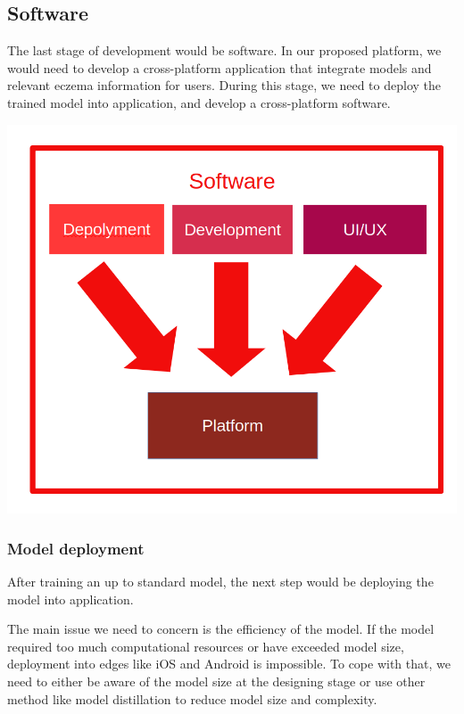     \subsection{Software}
        The last stage of development would be software. In our proposed platform, we would need to develop a cross-platform application that integrate models and relevant eczema information for users. During this stage, we need to deploy the trained model into application, and develop a cross-platform software.

                
        \begin{Figure}
            \centering
            \includegraphics[width=\linewidth]{Image/SoftwareWorkflow.png}
        \end{Figure}

        \subsubsection{Model deployment}
            After training an up to standard model, the next step would be deploying the model into application.

            The main issue we need to concern is the efficiency of the model. If the model required too much computational resources or have exceeded model size, deployment into edges like iOS and Android is impossible. To cope with that, we need to either be aware of the model size at the designing stage or use other method like model distillation to reduce model size and complexity.

